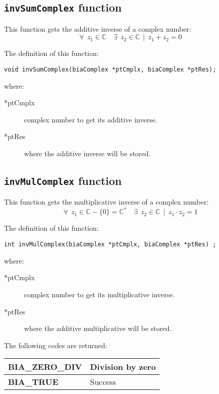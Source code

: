 \subsection{\texttt{invSumComplex} function}

This function gets the additive inverse of a complex number:
%
\begin{displaymath}
\forall \ \ z_1 \in \mathbb{C} \quad \exists \ \ z_2 \in \mathbb{C} \ \ | \ \ z_1 + z_2 = 0
\end{displaymath}

The definition of this function:
%
\begin{verbatim}
void invSumComplex(biaComplex *ptCmplx, biaComplex *ptRes);  
\end{verbatim}
%
where:
%
\begin{description}
\item[*ptCmplx] complex number to get its additive inverse.
\item[*ptRes] where the additive inverse will be stored.
\end{description}

\subsection{\texttt{invMulComplex} function}

This function gets the multiplicative inverse of a complex number:
%
\begin{displaymath}
\forall \ \ z_1 \in \mathbb{C} - \{0\} = \mathbb{C}^{*} \quad \exists \ \ z_2 \in \mathbb{C} \ \ | \ \ z_1 \cdot z_2 = 1
\end{displaymath}

The definition of this function:
%
\begin{verbatim}
int invMulComplex(biaComplex *ptCmplx, biaComplex *ptRes) ;  
\end{verbatim}
%
where:
%
\begin{description}
\item[*ptCmplx] complex number to get its multiplicative inverse.
\item[*ptRes] where the additive multiplicative will be stored.
\end{description}

The following codes are returned:

\begin{center}
\begin{tabular}{|l|l|}
\hline
\textbf{BIA\_ZERO\_DIV} & Division by zero \\
\hline
\textbf{BIA\_TRUE} & Success \\
\hline
\end{tabular}
\end{center}

